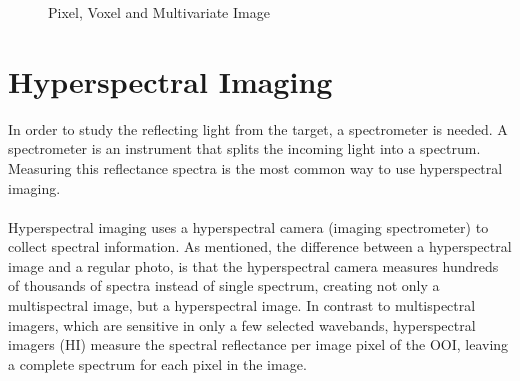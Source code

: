 \begin{figure}[H]
  \begin{minipage}{\wd\FigBox}
    \centering\usebox{\FigBox}
  \end{minipage}\hspace*{\FigHSkip}
  \caption{Pixel, Voxel and Multivariate Image}
  \label{fig:pogv}
\end{figure}

\vspace{1.3cm}
\section{Hyperspectral Imaging}
In order to study the reflecting light from the target, a spectrometer is needed. A spectrometer is an instrument that splits the incoming light into a spectrum. Measuring this reflectance spectra is the most common way to use hyperspectral imaging.
\\\\
Hyperspectral imaging uses a hyperspectral camera (imaging spectrometer) to collect spectral information. As mentioned, the difference between a hyperspectral image and a regular photo, is that the hyperspectral camera measures hundreds of thousands of spectra instead of single spectrum, creating not only a multispectral image, but a hyperspectral image. In contrast to multispectral imagers, which are sensitive in only a few selected wavebands, hyperspectral imagers (HI) measure the spectral reflectance per image pixel of the OOI, leaving a complete spectrum for each pixel in the image. %
